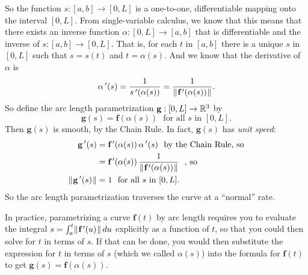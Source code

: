 So the function $s:[a,b] \rightarrow [0,L]$ is a one-to-one, differentiable mapping onto the interval $[0,L]$. From
single-variable calculus, we know that this means that there exists an inverse function $\alpha:[0,L] \rightarrow [a,b]$
that is differentiable and the inverse of $s:[a,b] \rightarrow [0,L]$. That is, for each $t$ in $[a,b]$
there is a unique $s$ in $[0,L]$ such that $s = s(t)$ and $t = \alpha(s)$. And we know that the derivative of $\alpha$
is
\begin{displaymath}
 \alpha\,'(s) = \dfrac{1}{s\,'(\alpha(s))} = \dfrac{1}{\lVert\mspace{1mu}\textbf{f}\,'(\alpha(s))\mspace{1mu}\rVert}.
\end{displaymath}
So define the arc length parametrization $\textbf{g}:[0,L] \rightarrow \mathbb{R}^{3}$ by
\begin{displaymath}
 \textbf{g}(s) = \textbf{f}(\alpha(s)) \text{~~for all $s$ in $[0,L]$.}
\end{displaymath}
Then $\textbf{g}(s)$ is smooth, by the Chain Rule. 
In fact, $\textbf{g}(s)$ has \emph{unit speed}:
\begin{align*}
 \textbf{g}\,'(s) &= \textbf{f}\,'(\alpha(s))\,\alpha\,'(s) \text{~~by the Chain Rule, so}\\
 &= \textbf{f}\,'(\alpha(s))\,\dfrac{1}{\lVert\mspace{1mu}\textbf{f}\,'(\alpha(s))\mspace{1mu}\rVert} \text{~~, so}\\
 \lVert\mspace{1mu}\textbf{g}\,'(s)\mspace{1mu}\rVert &= 1 \text{~~for all $s$ in $[0,L]$.}
\end{align*}
So the arc length parametrization traverses the curve at a ``normal'' rate.

In practice, parametrizing a curve $\textbf{f}(t)$ by arc length requires you to evaluate the integral $s = \int_{a}^{t}
\lVert\mspace{1mu}\textbf{f}\,'(u)\mspace{1mu}\rVert\,du$ explicitly as a function of $t$, 
so that you could then solve for $t$ in terms of $s$. 
If that can be done, you would then substitute the expression for $t$ in terms of $s$ (which we called $\alpha(s)$)
into the formula for $\textbf{f}(t)$ to get $\textbf{g}(s)=\textbf{f}(\alpha(s))$.

